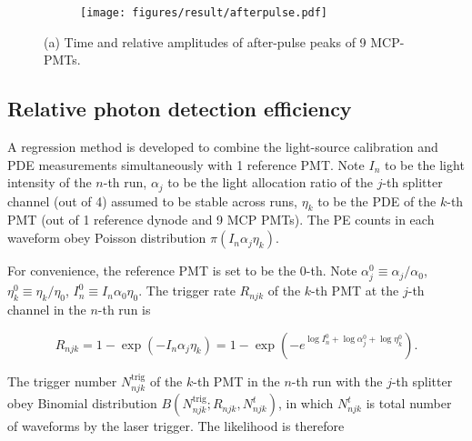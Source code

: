 \begin{figure}[!htbp]
    \centering
    \begin{subfigure}[t]{\SF\textwidth}
        \texttt{[image: figures/result/afterpulse.pdf]}
        \caption{}%
        \label{fig:afterpulsePeak}
    \end{subfigure}
    \begin{subfigure}[t]{\SF\textwidth}
        \caption{}
        \label{fig:prepulseCompare}
    \end{subfigure}
    \caption{(a) Time and relative amplitudes of after-pulse peaks of 9 MCP-PMTs.}
\end{figure}





\subsection{Relative photon detection efficiency}
\label{sec:PDE}
A regression method is developed to combine the light-source calibration and PDE measurements simultaneously with 1 reference PMT. Note $I_n$ to be the light intensity of the $n$-th run, $\alpha_j$ to be the light allocation ratio of the $j$-th splitter channel (out of 4) assumed to be stable across runs, $\eta_k$ to be the PDE of the $k$-th PMT (out of 1 reference dynode and 9 MCP PMTs). The PE counts in each waveform obey Poisson distribution $\pi(I_n\alpha_j\eta_k)$.

For convenience, the reference PMT is set to be the 0-th. Note $\alpha_j^0\equiv\alpha_j/{\alpha_0}$, $\eta_k^0\equiv\eta_k/{\eta_0}$, $I_n^0\equiv I_n\alpha_0\eta_0$.  The trigger rate $R_{njk}$ of the $k$-th PMT at the $j$-th channel in the $n$-th run is

\begin{equation}
    \label{equ:linkfunction}
    R_{njk}=1-\exp\left(-I_n\alpha_j\eta_k\right)=1-\exp\left(-e^{\log{I_n^0}+\log{\alpha_j^0}+\log{\eta_k^0}}\right).
\end{equation}

The trigger number $N^{\mathrm{trig}}_{njk}$ of the $k$-th PMT in the $n$-th run with the $j$-th splitter obey Binomial distribution $B(N^{\mathrm{trig}}_{njk};R_{njk},N^t_{njk})$, in which $N^t_{njk}$ is total number of waveforms by the laser trigger. The likelihood is therefore

